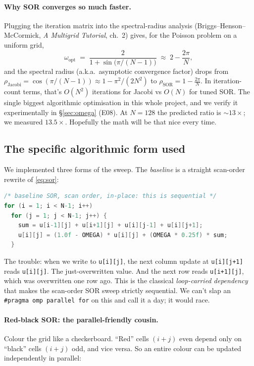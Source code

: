\documentclass[11pt]{article}
\begin{document}
\paragraph{Why SOR converges so much faster.}
Plugging the iteration matrix into the spectral-radius analysis
(Briggs--Henson--McCormick, \emph{A Multigrid Tutorial},
ch.~2) gives, for the Poisson problem on a uniform grid,
\begin{equation}
\omega_{\text{opt}} \;=\; \frac{2}{1 + \sin\!\bigl(\pi/(N{-}1)\bigr)}
\;\approx\; 2 - \frac{2\pi}{N},
\label{eq:omega-opt}
\end{equation}
and the spectral radius (a.k.a.\ asymptotic convergence factor) drops
from $\rho_{\text{Jacobi}} = \cos(\pi/(N{-}1)) \approx 1 - \pi^2/(2N^2)$
to $\rho_{\text{SOR}} = 1 - \frac{2\pi}{N}$.  In iteration-count terms,
that's $O(N^2)$ iterations for Jacobi vs $O(N)$ for tuned SOR. The
single biggest algorithmic optimisation in this whole project, and we
verify it experimentally in §\ref{sec:omega} (E08).  At $N{=}128$ the
predicted ratio is $\sim 13\times$; we measured $13.5\times$.  Hopefully
the math will be that nice every time.

\subsection{The specific algorithmic form used}

We implemented three forms of the sweep.  The \emph{baseline} is a
straight scan-order rewrite of \eqref{eq:sor}:

\begin{lstlisting}[language=C]
/* baseline SOR, scan order, in-place: this is sequential */
for (i = 1; i < N-1; i++)
  for (j = 1; j < N-1; j++) {
    sum = u[i-1][j] + u[i+1][j] + u[i][j-1] + u[i][j+1];
    u[i][j] = (1.0f - OMEGA) * u[i][j] + (OMEGA * 0.25f) * sum;
  }
\end{lstlisting}

\noindent The trouble: when we write to \texttt{u[i][j]}, the next
column update at \texttt{u[i][j+1]} reads \texttt{u[i][j]}. The
just-overwritten value.  And the next row reads \texttt{u[i+1][j]},
which was overwritten one row ago.  This is the classical
\emph{loop-carried dependency} that makes the scan-order SOR sweep
strictly sequential.  We can't slap an \texttt{\#pragma omp parallel
for} on this and call it a day; it would race.

\paragraph{Red-black SOR: the parallel-friendly cousin.}  Colour the
grid like a checkerboard.  ``Red''
cells $(i+j)$ even depend only on ``black'' cells $(i+j)$ odd, and vice
versa.  So an entire colour can be updated independently in parallel:
\end{document}
